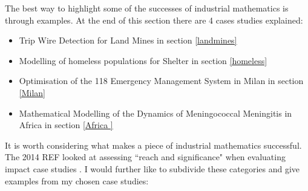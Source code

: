 \documentclass[11pt]{article} %
\begin{document}
	The best way to highlight some of the successes of industrial mathematics is through examples. At the end of this section there are 4 cases studies explained: 
	\begin{itemize}
		\item Trip Wire Detection for Land Mines in section \ref{landmines}
		\item Modelling of homeless populations for Shelter in section \ref{homeless}
		\item Optimisation of the 118 Emergency Management System in Milan in section \ref{Milan}
		\item Mathematical Modelling of the Dynamics of Meningococcal Meningitis in Africa in section \ref{Africa }
	\end{itemize}

It is worth considering what makes a piece of industrial mathematics successful. The 2014 REF looked at assessing ``reach and significance" when evaluating impact case studies \cite{impactcriteria2014}. I would further like to subdivide these categories and give examples from my chosen case studies:
\end{document}
